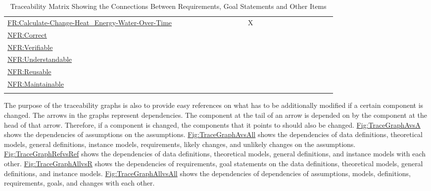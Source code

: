\documentclass[12pt]{article}
\begin{document}
\begin{longtable}{l l l l l l l l l l l l l l l l l l l l l l l}
\\
\hyperref[calcChgHeatEnergyWtrOverTime]{FR:Calculate-Change-Heat\_Energy-Water-Over-Time} &  &  &  &  &  &  &  &  &  &  & X &  &  &  &  &  &  &  &  &  &  & 
\\
\hyperref[correct]{NFR:Correct} &  &  &  &  &  &  &  &  &  &  &  &  &  &  &  &  &  &  &  &  &  & 
\\
\hyperref[verifiable]{NFR:Verifiable} &  &  &  &  &  &  &  &  &  &  &  &  &  &  &  &  &  &  &  &  &  & 
\\
\hyperref[understandable]{NFR:Understandable} &  &  &  &  &  &  &  &  &  &  &  &  &  &  &  &  &  &  &  &  &  & 
\\
\hyperref[reusable]{NFR:Reusable} &  &  &  &  &  &  &  &  &  &  &  &  &  &  &  &  &  &  &  &  &  & 
\\
\hyperref[maintainable]{NFR:Maintainable} &  &  &  &  &  &  &  &  &  &  &  &  &  &  &  &  &  &  &  &  &  & 
\\
\bottomrule
\caption{Traceability Matrix Showing the Connections Between Requirements, Goal Statements and Other Items}
\label{Table:TraceMatAllvsR}
\end{longtable}
The purpose of the traceability graphs is also to provide easy references on what has to be additionally modified if a certain component is changed. The arrows in the graphs represent dependencies. The component at the tail of an arrow is depended on by the component at the head of that arrow. Therefore, if a component is changed, the components that it points to should also be changed. \hyperref[Figure:TraceGraphAvsA]{Fig:TraceGraphAvsA} shows the dependencies of assumptions on the assumptions. \hyperref[Figure:TraceGraphAvsAll]{Fig:TraceGraphAvsAll} shows the dependencies of data definitions, theoretical models, general definitions, instance models, requirements, likely changes, and unlikely changes on the assumptions. \hyperref[Figure:TraceGraphRefvsRef]{Fig:TraceGraphRefvsRef} shows the dependencies of data definitions, theoretical models, general definitions, and instance models with each other. \hyperref[Figure:TraceGraphAllvsR]{Fig:TraceGraphAllvsR} shows the dependencies of requirements, goal statements on the data definitions, theoretical models, general definitions, and instance models. \hyperref[Figure:TraceGraphAllvsAll]{Fig:TraceGraphAllvsAll} shows the dependencies of dependencies of assumptions, models, definitions, requirements, goals, and changes with each other.
\end{document}
